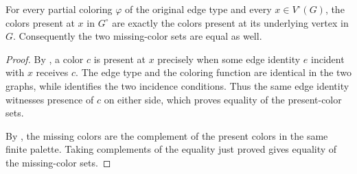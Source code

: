 \begin{lemma}
For every partial coloring $\varphi$ of the original edge type and every
$x\in V^{\circ}(G)$, the colors present at $x$ in $G^{\circ}$ are exactly
the colors present at its underlying vertex in $G$.  Consequently the two
missing-color sets are equal as well.
\end{lemma}
\begin{proof}
By , a color $c$ is present at $x$ precisely when
some edge identity $e$ incident with $x$ receives $c$.  The edge type and
the coloring function are identical in the two graphs, while
 identifies the two incidence conditions.
Thus the same edge identity witnesses presence of $c$ on either side, which
proves equality of the present-color sets.

By , the missing colors are the complement of the
present colors in the same finite palette.  Taking complements of the
equality just proved gives equality of the missing-color sets.
\end{proof}
